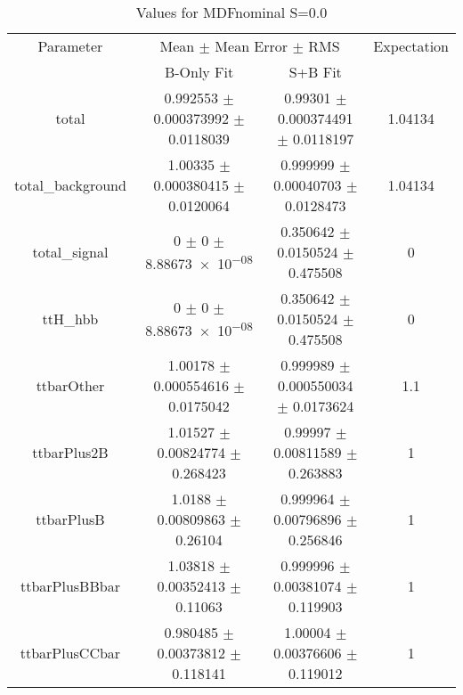 \begin{table}
\centering
\caption{Values for MDFnominal S=0.0}
\begin{tabular}{cccc}
\toprule
Parameter & \multicolumn{2}{c}{Mean $\pm$ Mean Error $\pm$ RMS} & Expectation\\
 & B-Only Fit & S+B Fit & \\
\midrule
total & \num{0.992553} $\pm$ \num{0.000373992} $\pm$ \num{0.0118039} & \num{0.99301} $\pm$ \num{0.000374491} $\pm$ \num{0.0118197} & \num{1.04134}\\
total\_background & \num{1.00335} $\pm$ \num{0.000380415} $\pm$ \num{0.0120064} & \num{0.999999} $\pm$ \num{0.00040703} $\pm$ \num{0.0128473} & \num{1.04134}\\
total\_signal & \num{0} $\pm$ \num{0} $\pm$ \num{8.88673e-08} & \num{0.350642} $\pm$ \num{0.0150524} $\pm$ \num{0.475508} & \num{0}\\
ttH\_hbb & \num{0} $\pm$ \num{0} $\pm$ \num{8.88673e-08} & \num{0.350642} $\pm$ \num{0.0150524} $\pm$ \num{0.475508} & \num{0}\\
ttbarOther & \num{1.00178} $\pm$ \num{0.000554616} $\pm$ \num{0.0175042} & \num{0.999989} $\pm$ \num{0.000550034} $\pm$ \num{0.0173624} & \num{1.1}\\
ttbarPlus2B & \num{1.01527} $\pm$ \num{0.00824774} $\pm$ \num{0.268423} & \num{0.99997} $\pm$ \num{0.00811589} $\pm$ \num{0.263883} & \num{1}\\
ttbarPlusB & \num{1.0188} $\pm$ \num{0.00809863} $\pm$ \num{0.26104} & \num{0.999964} $\pm$ \num{0.00796896} $\pm$ \num{0.256846} & \num{1}\\
ttbarPlusBBbar & \num{1.03818} $\pm$ \num{0.00352413} $\pm$ \num{0.11063} & \num{0.999996} $\pm$ \num{0.00381074} $\pm$ \num{0.119903} & \num{1}\\
ttbarPlusCCbar & \num{0.980485} $\pm$ \num{0.00373812} $\pm$ \num{0.118141} & \num{1.00004} $\pm$ \num{0.00376606} $\pm$ \num{0.119012} & \num{1}\\
\bottomrule
\end{tabular}
\end{table}